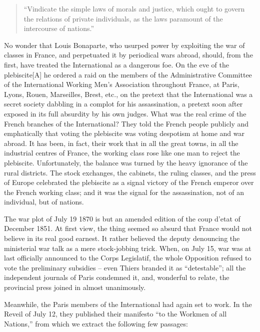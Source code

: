 \documentclass{article}
\begin{document}
\begin{quote}

``Vindicate the simple laws of morals and justice, which ought to govern
the relations of private individuals, as the laws paramount of the
intercourse of nations.”

\end{quote}

No wonder that Louis Bonaparte, who usurped power by exploiting the war of
classes in France, and perpetuated it by periodical wars abroad, should,
from the first, have treated the International as a dangerous foe. On the
eve of the plebiscite[A] he ordered a raid on the members of the
Administrative Committee of the International Working Men’s Association
throughout France, at Paris, Lyons, Rouen, Marseilles, Brest, etc., on the
pretext that the International was a secret society dabbling in a complot
for his assassination, a pretext soon after exposed in its full absurdity
by his own judges. What was the real crime of the French branches of the
International? They told the French people publicly and emphatically that
voting the plebiscite was voting despotism at home and war abroad. It has
been, in fact, their work that in all the great towns, in all the
industrial centres of France, the working class rose like one man to
reject the plebiscite. Unfortunately, the balance was turned by the heavy
ignorance of the rural districts. The stock exchanges, the cabinets, the
ruling classes, and the press of Europe celebrated the plebiscite as
a signal victory of the French emperor over the French working class; and
it was the signal for the assassination, not of an individual, but of
nations.

The war plot of July 19 1870 is but an amended edition of the coup
d’etat of December 1851. At first view, the thing seemed so absurd that
France would not believe in its real good earnest. It rather believed the
deputy denouncing the ministerial war talk as a mere stock-jobbing trick.
When, on July 15, war was at last officially announced to the Corps
Legislatif, the whole Opposition refused to vote the preliminary subsidies
– even Thiers branded it as “detestable”; all the independent journals of
Paris condemned it, and, wonderful to relate, the provincial press joined
in almost unanimously.

Meanwhile, the Paris members of the International had again set to work.
In the Reveil of July 12, they published their manifesto “to the Workmen
of all Nations,” from which we extract the following few passages:
\end{document}
